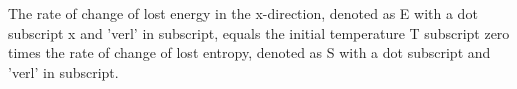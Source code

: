 The rate of change of lost energy in the x-direction, denoted as E with a dot subscript x and 'verl' in subscript, equals the initial temperature T subscript zero times the rate of change of lost entropy, denoted as S with a dot subscript and 'verl' in subscript.